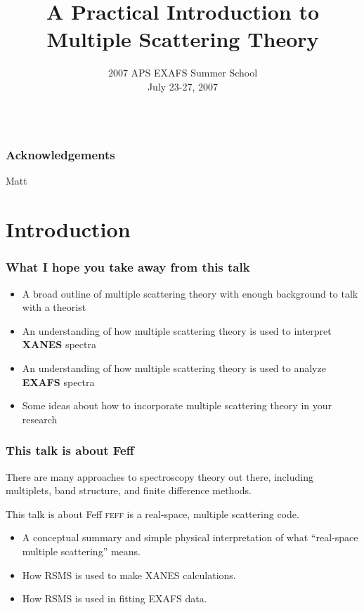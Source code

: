 \documentclass[10pt, xcolor=x11names, compress]{beamer}
\title{A Practical Introduction to Multiple Scattering Theory}
\date[APS EXAFS 07]{2007 APS EXAFS Summer School\\July 23-27, 2007\\~}
\begin{document}
\maketitle

\begin{frame}
  \frametitle{Acknowledgements}
  Matt
\end{frame}

\section{Introduction}

\begin{frame}
  \frametitle{What I hope you take away from this talk}
  \begin{itemize}
  \item A broad outline of multiple scattering theory with enough
    background to talk with a theorist
  \item An understanding of how multiple scattering theory is used to
    interpret \textbf{XANES} spectra
  \item An understanding of how multiple scattering theory is used to
    analyze \textbf{EXAFS} spectra
  \item Some ideas about how to incorporate multiple scattering theory
    in your research
  \end{itemize}
\end{frame}

\begin{frame}
  \frametitle{This talk is about Feff}

  There are many approaches to spectroscopy theory out there,
  including multiplets, band structure, and finite difference methods.

  \bigskip

  \begin{exampleblock}{This talk is about Feff}
    \textsc{feff} is a real-space, multiple scattering code.
  \end{exampleblock}
  
  \bigskip

  \begin{itemize}
  \item A conceptual summary and simple physical interpretation of
    what ``real-space multiple scattering'' means.
  \item How RSMS is used to make XANES calculations.
  \item How RSMS is used in fitting EXAFS data.
  \end{itemize}
\end{frame}
\end{document}
